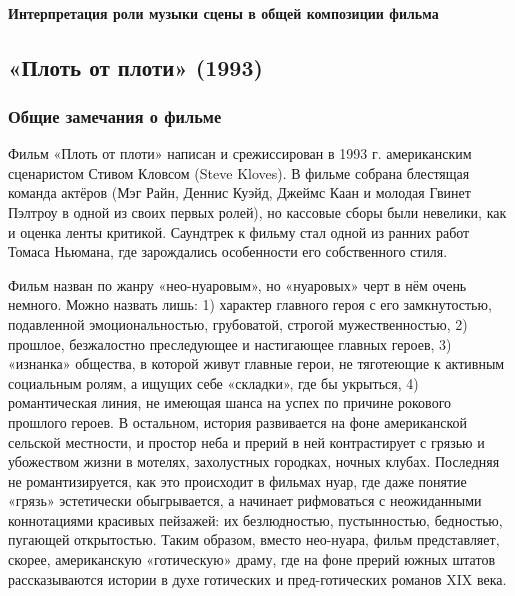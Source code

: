\paragraph{Интерпретация роли музыки сцены в общей композиции фильма}\label{ux438ux43dux442ux435ux440ux43fux440ux435ux442ux430ux446ux438ux44f-ux440ux43eux43bux438-ux43cux443ux437ux44bux43aux438-ux441ux446ux435ux43dux44b-ux432-ux43eux431ux449ux435ux439-ux43aux43eux43cux43fux43eux437ux438ux446ux438ux438-ux444ux438ux43bux44cux43cux430}

\subsection{«Плоть от плоти» (1993)}\label{sec.SmEt.FnB}

\subsubsection{Общие замечания о фильме}\label{ux43eux431ux449ux438ux435-ux437ux430ux43cux435ux447ux430ux43dux438ux44f-ux43e-ux444ux438ux43bux44cux43cux435-1}

Фильм «Плоть от плоти» написан и срежиссирован в 1993 г. американским сценаристом Стивом Кловсом (Steve Kloves).
В фильме собрана блестящая команда актёров (Мэг Райн, Деннис Куэйд, Джеймс Каан и молодая Гвинет Пэлтроу в одной из своих первых ролей), но кассовые сборы были невелики, как и оценка ленты критикой.
Саундтрек к фильму стал одной из ранних работ Томаса Ньюмана, где зарождались особенности его собственного стиля.

Фильм назван по жанру «нео-нуаровым», но «нуаровых» черт в нём очень немного.
Можно назвать лишь: 1) характер главного героя с его замкнутостью, подавленной эмоциональностью, грубоватой, строгой мужественностью, 2) прошлое, безжалостно преследующее и настигающее главных героев, 3) «изнанка» общества, в которой живут главные герои, не тяготеющие к активным социальным ролям, а ищущих себе «складки», где бы укрыться, 4) романтическая линия, не имеющая шанса на успех по причине рокового прошлого героев.
В остальном, история развивается на фоне американской сельской местности, и простор неба и прерий в ней контрастирует с грязью и убожеством жизни в мотелях, захолустных городках, ночных клубах.
Последняя не романтизируется, как это происходит в фильмах нуар, где даже понятие «грязь» эстетически обыгрывается, а начинает рифмоваться с неожиданными коннотациями красивых пейзажей: их безлюдностью, пустынностью, бедностью, пугающей открытостью.
Таким образом, вместо нео-нуара, фильм представляет, скорее, американскую «готическую» драму, где на фоне прерий южных штатов рассказываются истории в духе готических и пред-готических романов XIX века.

